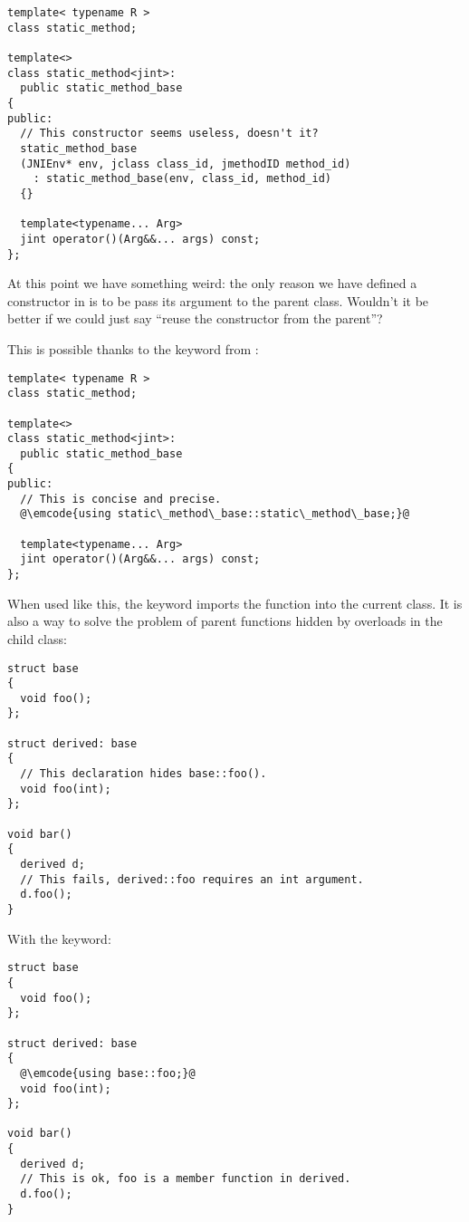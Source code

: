\begin{lstlisting}
template< typename R >
class static_method;

template<>
class static_method<jint>:
  public static_method_base
{
public:
  // This constructor seems useless, doesn't it?
  static_method_base
  (JNIEnv* env, jclass class_id, jmethodID method_id)
    : static_method_base(env, class_id, method_id)
  {}

  template<typename... Arg>
  jint operator()(Arg&&... args) const;
};
\end{lstlisting}

At this point we have something weird: the only reason we have defined
a constructor in  is
to be pass its argument to the parent class. Wouldn't it be better if
we could just say ``reuse the constructor from the parent''?

\solutiontitle

This is possible thanks to the  keyword from :

\begin{lstlisting}
template< typename R >
class static_method;

template<>
class static_method<jint>:
  public static_method_base
{
public:
  // This is concise and precise.
  @\emcode{using static\_method\_base::static\_method\_base;}@

  template<typename... Arg>
  jint operator()(Arg&&... args) const;
};
\end{lstlisting}

When used like this, the  keyword imports the function
into the current class. It is also a way to solve the problem of
parent functions hidden by overloads in the child class:

\begin{lstlisting}
struct base
{
  void foo();
};

struct derived: base
{
  // This declaration hides base::foo().
  void foo(int);
};

void bar()
{
  derived d;
  // This fails, derived::foo requires an int argument.
  d.foo();
}
\end{lstlisting}

With the  keyword:

\begin{lstlisting}
struct base
{
  void foo();
};

struct derived: base
{
  @\emcode{using base::foo;}@
  void foo(int);
};

void bar()
{
  derived d;
  // This is ok, foo is a member function in derived.
  d.foo();
}
\end{lstlisting}
